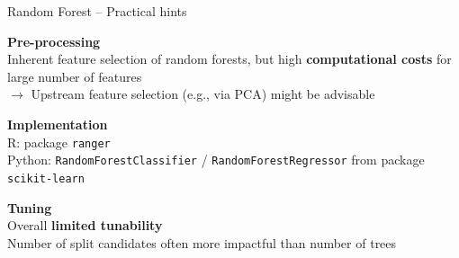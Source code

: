 \documentclass[11pt,compress,t,notes=noshow, xcolor=table]{beamer}
\newcommand{\highlight}[1]{\textcolor{highlightcol}{\textbf{#1}}}
\let\code=\texttt
\begin{document}
\begin{frame}{Random Forest -- Practical hints}

\footnotesize

\highlight{Pre-processing} \\
\smallskip
Inherent feature selection of random forests, but high \textbf{computational 
costs} for large number of features \\
$\rightarrow$ Upstream feature selection (e.g., via PCA) might be advisable
\lz

\highlight{Implementation} \\
\smallskip
R: package \code{ranger}\\
Python: \code{RandomForestClassifier} / \code{RandomForestRegressor} from 
package \code{scikit-learn}
\lz

\highlight{Tuning} \\
\smallskip
Overall \textbf{limited tunability} \\
Number of split candidates often more impactful than number of trees

\end{frame}

\end{document}
